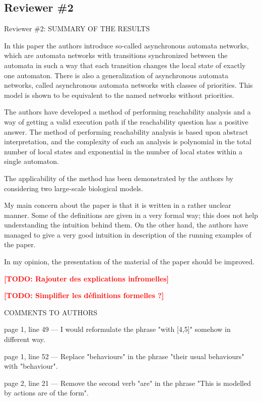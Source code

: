 \documentclass[11pt]{article}
\newcommand{\todo}[1]{\textcolor{red}{\textbf{[TODO: #1]}}}
\begin{document}
\subsection*{Reviewer \#2}



Reviewer \#2: SUMMARY OF THE RESULTS

In this paper the authors introduce so-called asynchronous automata networks, which are automata networks with transitions synchronized between the automata in such a way that each transition changes the local state of exactly one automaton. There is also a generalization of asynchronous automata networks, called asynchronous automata networks with classes of priorities. This model is shown to be equivalent to the named networks without priorities.

The authors have developed a method of performing reachability analysis and a way of getting a valid execution path if the reachability question has a positive answer. The method of performing reachability analysis is based upon abstract interpretation, and the complexity of such an analysis is polynomial in the total number of local states and exponential in the number of local states within a single automaton.

The applicability of the method has been demonstrated by the authors by considering two large-scale biological models.

My main concern about the paper is that it is written in a rather unclear manner. Some of the definitions are given in a very formal way; this does not help understanding the intuition behind them. On the other hand, the authors have managed to give a very good intuition in description of the running examples of the paper.

In my opinion, the presentation of the material of the paper should be improved.

\todo{Rajouter des explications infromelles}

\todo{Simplifier les définitions formelles ?}

COMMENTS TO AUTHORS

page 1, line 49 ---
I would reformulate the phrase "with [4,5]" somehow in different way.

page 1, line 52 ---
Replace "behaviours" in the phrase "their usual behaviours" with "behaviour".

page 2, line 21 ---
Remove the second verb "are" in the phrase "This is modelled by actions are of the form".
\end{document}
